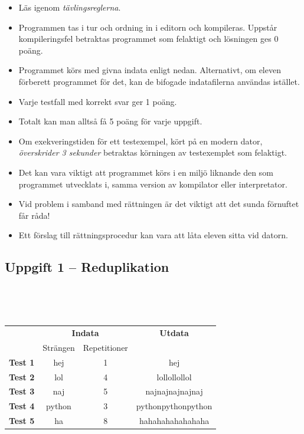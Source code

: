 \documentclass[a4paper,12pt,oneside]{amsbook}
\theoremstyle{test}
\newcommand{\fe}[1]{\textbf{#1}}            %
\begin{document}


\thispagestyle{fancy}
\lhead{}
\begin{itemize}
\item Läs igenom \textit{tävlingsreglerna}.
\item Programmen tas i tur och ordning in i editorn och kompileras.
Uppstår kompileringsfel betraktas programmet som felaktigt och lösningen
ges $0$ poäng.
\item Programmet körs med givna indata enligt nedan. Alternativt, om eleven förberett programmet för det, kan de bifogade indatafilerna användas istället.
\item Varje testfall
  med korrekt svar ger 1 poäng.
\item
Totalt kan man
  alltså få 5 poäng för varje uppgift.
\item Om exekveringstiden för ett testexempel, kört på en modern dator,
\textit{överskrider 3 sekunder} betraktas körningen av testexemplet som felaktigt.
\item Det kan vara viktigt att programmet körs i en miljö liknande den som
programmet utvecklats i, samma version av kompilator eller
interpretator.
\item Vid problem i samband med rättningen är det viktigt att det sunda
förnuftet får råda!
\item Ett förslag till rättningsprocedur kan vara att låta eleven
sitta vid datorn.
\end{itemize}

\vspace{1cm}

\subsection*{Uppgift 1 -- Reduplikation}
~\\
{\tt 
\begin{tabular}{||l||c|c||c||}\hline\hline
& \multicolumn{2}{c||}{\fe{Indata}} & \multicolumn{1}{c||}{\fe{Utdata}} \\ 
& Strängen & Repetitioner &  \\ \hline \hline
\fe{Test 1} & hej &1&hej\\ \hline
\fe{Test 2} & lol &4&lollollollol \\ \hline
\fe{Test 3} & naj &5&najnajnajnajnaj \\ \hline
\fe{Test 4} & python&3&pythonpythonpython \\ \hline
\fe{Test 5} & ha &8&hahahahahahahaha\\ \hline\hline
\end{tabular}
}
\end{document}
